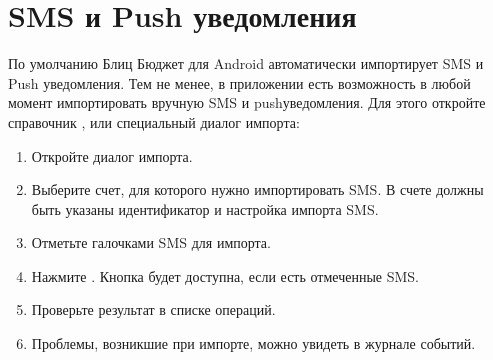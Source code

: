 \documentclass[a4paper,10pt,russian]{sphinxmanual}
\begin{document}
\section{SMS и Push уведомления}
\label{\detokenize{import:sms-push}}
\sphinxAtStartPar
По умолчанию Блиц Бюджет для Android автоматически импортирует SMS и Push уведомления. Тем не менее, в приложении есть возможность
в любой момент импортировать вручную SMS и push\sphinxhyphen{}уведомления. Для этого откройте справочник ,  или
специальный диалог импорта:
\begin{enumerate}
%
\item {} 
\sphinxAtStartPar
Откройте диалог импорта.

\item {} 
\sphinxAtStartPar
Выберите счет, для которого нужно импортировать SMS. В счете должны быть указаны идентификатор и настройка импорта SMS.

\item {} 
\sphinxAtStartPar
Отметьте галочками SMS для импорта.

\item {} 
\sphinxAtStartPar
Нажмите . Кнопка будет доступна, если есть отмеченные SMS.

\item {} 
\sphinxAtStartPar
Проверьте результат в списке операций.

\item {} 
\sphinxAtStartPar
Проблемы, возникшие при импорте, можно увидеть в журнале событий.

\end{enumerate}

\noindent{}

\noindent{}

\noindent{}

\noindent{}

\noindent{}

\noindent{}
\end{document}
